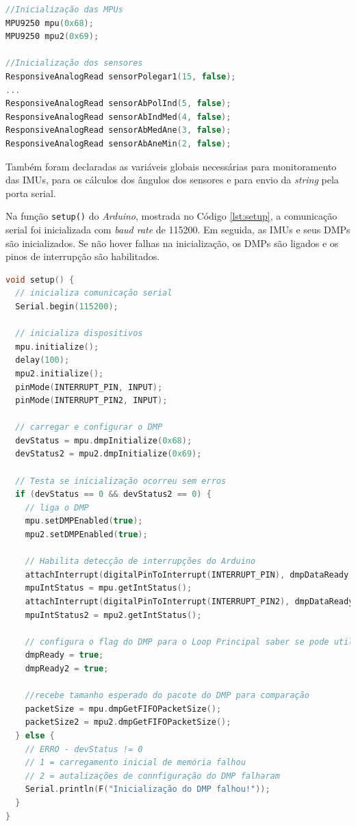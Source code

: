 \begin{lstlisting}[language=C++,label=lst:inicMPU,caption={Inicialização dos objetos},morekeywords={ResponsiveAnalogRead,MPU9250}]
//Inicialização das MPUs
MPU9250 mpu(0x68);
MPU9250 mpu2(0x69);

//Inicialização dos sensores
ResponsiveAnalogRead sensorPolegar1(15, false);
...
ResponsiveAnalogRead sensorAbPolInd(5, false);
ResponsiveAnalogRead sensorAbIndMed(4, false);
ResponsiveAnalogRead sensorAbMedAne(3, false);
ResponsiveAnalogRead sensorAbAneMin(2, false);
\end{lstlisting}

Também foram declaradas as variáveis globais necessárias para monitoramento das \ac{IMU}s, para os cálculos dos ângulos dos sensores e para envio da \textit{string} pela porta serial.

Na função \lstinline!setup()! do \textit{Arduino}, mostrada no Código \ref{lst:setup}, a comunicação serial foi inicializada com \textit{baud rate} de 115200. Em seguida, as \ac{IMU}s e seus \ac{DMP}s são inicializados. Se não hover falhas na inicialização, os \ac{DMP}s são ligados e os pinos de interrupção são habilitados.

\begin{lstlisting}[language=C++,label=lst:setup,caption={Função setup()},morekeywords={ResponsiveAnalogRead,MPU9250,delay,Serial,begin,println,print,attachInterrupt,pinMode}]
void setup() {
  // inicializa comunicação serial
  Serial.begin(115200);

  // inicializa dispositivos
  mpu.initialize();
  delay(100);
  mpu2.initialize();
  pinMode(INTERRUPT_PIN, INPUT);
  pinMode(INTERRUPT_PIN2, INPUT);

  // carregar e configurar o DMP
  devStatus = mpu.dmpInitialize(0x68);
  devStatus2 = mpu2.dmpInitialize(0x69);

  // Testa se inicialização ocorreu sem erros
  if (devStatus == 0 && devStatus2 == 0) {
    // liga o DMP
    mpu.setDMPEnabled(true);
    mpu2.setDMPEnabled(true);

    // Habilita detecção de interrupções do Arduino
    attachInterrupt(digitalPinToInterrupt(INTERRUPT_PIN), dmpDataReady, RISING);
    mpuIntStatus = mpu.getIntStatus();
    attachInterrupt(digitalPinToInterrupt(INTERRUPT_PIN2), dmpDataReady2, RISING);
    mpuIntStatus2 = mpu2.getIntStatus();

    // configura o flag do DMP para o Loop Principal saber se pode utilizá-lo
    dmpReady = true;
    dmpReady2 = true;

    //recebe tamanho esperado do pacote do DMP para comparação
    packetSize = mpu.dmpGetFIFOPacketSize();
    packetSize2 = mpu2.dmpGetFIFOPacketSize();
  } else {
    // ERRO - devStatus != 0
    // 1 = carregamento inicial de memória falhou
    // 2 = autalizações de connfiguração do DMP falharam
    Serial.println(F("Inicialização do DMP falhou!"));
  }
}
\end{lstlisting}

